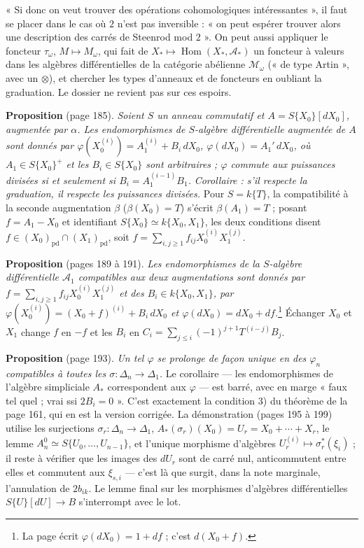 \documentclass[11pt,a4paper]{article}
\begin{document}
« Si donc on veut trouver des opérations cohomologiques intéressantes », il
faut se placer dans le cas où $2$ n'est pas inversible : « on peut espérer
trouver alors une description des carrés de Steenrod mod $2$ ». On peut aussi
appliquer le foncteur $\tau_\omega$, $M \mapsto M_\omega$, qui fait de
$X_* \mapsto \operatorname{Hom}(X_*, \mathcal{A}_*)$ un foncteur à valeurs dans
les algèbres différentielles de la catégorie abélienne $\mathcal{M}_\omega$
(« de type Artin », avec un $\otimes$), et chercher les types d'anneaux et de
foncteurs en oubliant la graduation. Le dossier ne revient pas sur ces
espoirs.

\textbf{Proposition} (page 185). \emph{Soient $S$ un anneau commutatif et $A =
S\{X_0\}[dX_0]$, augmentée par $\alpha$. Les endomorphismes de $S$-algèbre
différentielle augmentée de $A$ sont donnés par $\varphi(X_0^{(i)}) = A_1^{(i)} +
B_i\,dX_0$, $\varphi(dX_0) = A_1'\,dX_0$, où $A_1 \in S\{X_0\}^+$ et les $B_i \in
S\{X_0\}$ sont arbitraires ; $\varphi$ commute aux puissances divisées si et
seulement si $B_i = A_1^{(i-1)}B_1$.} \emph{Corollaire : s'il respecte la
graduation, il respecte les puissances divisées.} Pour $S = k\{T\}$, la
compatibilité à la seconde augmentation $\beta$ ($\beta(X_0) = T$) s'écrit
$\beta(A_1) = T$ ; posant $f = A_1 - X_0$ et identifiant $S\{X_0\} \simeq k\{X_0,
X_1\}$, les deux conditions disent $f \in (X_0)_{\mathrm{pd}} \cap
(X_1)_{\mathrm{pd}}$, soit $f = \sum_{i,j \geq 1} f_{ij}X_0^{(i)}X_1^{(j)}$.

\textbf{Proposition} (pages 189 à 191). \emph{Les endomorphismes de la
$S$-algèbre différentielle $\mathcal{A}_1$ compatibles aux deux augmentations
sont donnés par $f = \sum_{i,j \geq 1} f_{ij}X_0^{(i)}X_1^{(j)}$ et des $B_i \in
k\{X_0,X_1\}$, par $\varphi(X_0^{(i)}) = (X_0 + f)^{(i)} + B_i\,dX_0$ et
$\varphi(dX_0) = dX_0 + df$.}\footnote{La page écrit $\varphi(dX_0) = 1 +
df$ ; c'est $d(X_0 + f)$.} Échanger $X_0$ et $X_1$ change $f$ en $-f$ et les
$B_i$ en $C_i = \sum_{j \leq i} (-1)^{j+1}T^{(i-j)}B_j$.

\textbf{Proposition} (page 193). \emph{Un tel $\varphi$ se prolonge de façon
unique en des $\varphi_n$ compatibles à toutes les $\sigma : \Delta_n \to
\Delta_1$.} Le corollaire — les endomorphismes de l'algèbre simpliciale $A_*$
correspondent aux $\varphi$ — est barré, avec en marge « faux tel quel ; vrai ssi
$2B_i = 0$ ». C'est exactement la condition 3) du théorème de la page 161, qui
en est la version corrigée. La démonstration (pages 195 à 199) utilise les
surjections $\sigma_r : \Delta_n \to \Delta_1$, $A_*(\sigma_r)(X_0) = U_r = X_0 +
\cdots + X_r$, le lemme $A_n^0 \simeq S\{U_0,\ldots,U_{n-1}\}$, et l'unique
morphisme d'algèbres $U_r^{(i)} \mapsto \sigma_r^*(\xi_i)$ ; il reste à vérifier
que les images des $dU_r$ sont de carré nul, anticommutent entre elles et
commutent aux $\xi_{s,i}$ — c'est là que surgit, dans la note marginale,
l'annulation de $2b_{ik}$. Le lemme final sur les morphismes d'algèbres
différentielles $S\{U\}[dU] \to B$ s'interrompt avec le lot.
\end{document}
